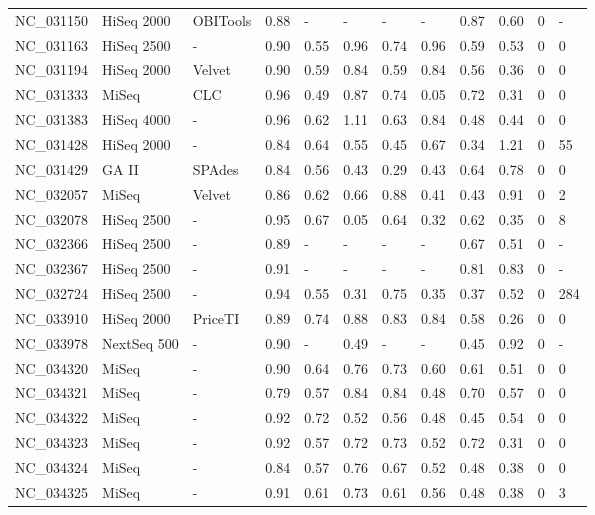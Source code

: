 \begin{table}[ht]
\begin{tabular}{llllllllllll}
  NC\_031150 & HiSeq 2000 & OBITools & 0.88 & - & - & - & - & 0.87 & 0.60 &   0 & - \\ 
  NC\_031163 & HiSeq 2500 & - & 0.90 & 0.55 & 0.96 & 0.74 & 0.96 & 0.59 & 0.53 &   0 &     0 \\ 
  NC\_031194 & HiSeq 2000 & Velvet & 0.90 & 0.59 & 0.84 & 0.59 & 0.84 & 0.56 & 0.36 &   0 &     0 \\ 
  NC\_031333 & MiSeq & CLC & 0.96 & 0.49 & 0.87 & 0.74 & 0.05 & 0.72 & 0.31 &   0 &     0 \\ 
  NC\_031383 & HiSeq 4000 & - & 0.96 & 0.62 & 1.11 & 0.63 & 0.84 & 0.48 & 0.44 &   0 &     0 \\ 
  NC\_031428 & HiSeq 2000 & - & 0.84 & 0.64 & 0.55 & 0.45 & 0.67 & 0.34 & 1.21 &   0 &    55 \\ 
  NC\_031429 & GA II & SPAdes & 0.84 & 0.56 & 0.43 & 0.29 & 0.43 & 0.64 & 0.78 &   0 &     0 \\ 
  NC\_032057 & MiSeq & Velvet & 0.86 & 0.62 & 0.66 & 0.88 & 0.41 & 0.43 & 0.91 &   0 &     2 \\ 
  NC\_032078 & HiSeq 2500 & - & 0.95 & 0.67 & 0.05 & 0.64 & 0.32 & 0.62 & 0.35 &   0 &     8 \\ 
  NC\_032366 & HiSeq 2500 & - & 0.89 & - & - & - & - & 0.67 & 0.51 &   0 & - \\ 
  NC\_032367 & HiSeq 2500 & - & 0.91 & - & - & - & - & 0.81 & 0.83 &   0 & - \\ 
  NC\_032724 & HiSeq 2500 & - & 0.94 & 0.55 & 0.31 & 0.75 & 0.35 & 0.37 & 0.52 &   0 &   284 \\ 
  NC\_033910 & HiSeq 2000 & PriceTI & 0.89 & 0.74 & 0.88 & 0.83 & 0.84 & 0.58 & 0.26 &   0 &     0 \\ 
  NC\_033978 & NextSeq 500 & - & 0.90 & - & 0.49 & - & - & 0.45 & 0.92 &   0 & - \\ 
  NC\_034320 & MiSeq & - & 0.90 & 0.64 & 0.76 & 0.73 & 0.60 & 0.61 & 0.51 &   0 &     0 \\ 
  NC\_034321 & MiSeq & - & 0.79 & 0.57 & 0.84 & 0.84 & 0.48 & 0.70 & 0.57 &   0 &     0 \\ 
  NC\_034322 & MiSeq & - & 0.92 & 0.72 & 0.52 & 0.56 & 0.48 & 0.45 & 0.54 &   0 &     0 \\ 
  NC\_034323 & MiSeq & - & 0.92 & 0.57 & 0.72 & 0.73 & 0.52 & 0.72 & 0.31 &   0 &     0 \\ 
  NC\_034324 & MiSeq & - & 0.84 & 0.57 & 0.76 & 0.67 & 0.52 & 0.48 & 0.38 &   0 &     0 \\ 
  NC\_034325 & MiSeq & - & 0.91 & 0.61 & 0.73 & 0.61 & 0.56 & 0.48 & 0.38 &   0 &     3 \\ 

\end{tabular}
\end{table}
